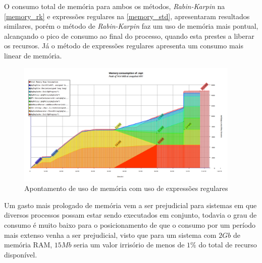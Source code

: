 O consumo total de memória para ambos os métodos, \textit{Rabin-Karpin} na \autoref{memory_rk} e expressões regulares na \autoref{memory_std},  apresentaram resultados similares, porém o método de \textit{Rabin-Karpin} faz um uso de memória mais pontual, alcançando o pico de consumo ao final do processo, quando esta prestes a liberar os recursos. Já o método de expressões regulares apresenta um consumo mais linear de memória. 


\begin{figure}[htbp]
  \centering
  \includegraphics[width=0.95\textwidth]{figuras/memory_regex.png}
  \caption{Apontamento de uso de memória com uso de expressões regulares}
  \label{memory_std}
\end{figure}

Um gasto mais prologado de memória vem a ser prejudicial para sistemas em que diversos processos possam estar sendo executados em conjunto, todavia o grau de consumo é muito baixo para o posicionamento de que o consumo por um período mais extenso venha a ser prejudicial, visto que para um sistema com $2Gb$ de memória RAM, $15Mb$ seria um valor irrisório de menos de $1\%$ do total de recurso disponível.

